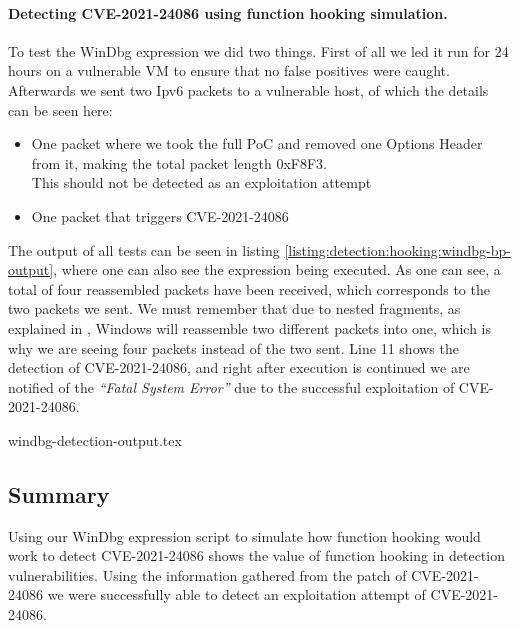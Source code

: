 \documentclass{report}
\begin{document}
\paragraph{Detecting CVE-2021-24086 using function hooking simulation.} To test the WinDbg expression we did two things. First of all we led it run for 24 hours on a vulnerable VM to ensure that no false positives were caught. Afterwards we sent two Ipv6 packets to a vulnerable host, of which the details can be seen here:
\begin{itemize}
    \item One packet where we took the full PoC and removed one Options Header from it, making the total packet length 0xF8F3.\\This should not be detected as an exploitation attempt
    \item One packet that triggers CVE-2021-24086
\end{itemize}

The output of all tests can be seen in listing \ref{listing:detection:hooking:windbg-bp-output}, where one can also see the expression being executed. As one can see, a total of four reassembled packets have been received, which corresponds to the two packets we sent. We must remember that due to nested fragments, as explained in , Windows will reassemble two different packets into one, which is why we are seeing four packets instead of the two sent. Line 11 shows the detection of CVE-2021-24086, and right after execution is continued we are notified of the \emph{``Fatal System Error''} due to the successful exploitation of CVE-2021-24086.

{windbg-detection-output.tex}

\subsection{Summary}

Using our WinDbg expression script to simulate how function hooking would work to detect CVE-2021-24086 shows the value of function hooking in detection vulnerabilities. Using the information gathered from the patch of CVE-2021-24086 we were successfully able to detect an exploitation attempt of CVE-2021-24086.
\end{document}
